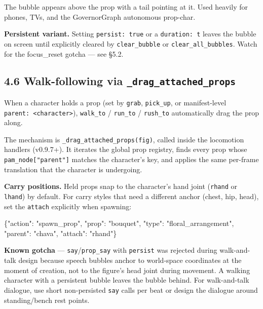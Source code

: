 \documentclass[
  12pt,
  letterpaper,
]{book}
\newenvironment{Shaded}{}{}
\newcommand{\DataTypeTok}[1]{\textcolor[rgb]{0.56,0.13,0.00}{#1}}
\newcommand{\FunctionTok}[1]{\textcolor[rgb]{0.02,0.16,0.49}{#1}}
\newcommand{\StringTok}[1]{\textcolor[rgb]{0.25,0.44,0.63}{#1}}
\begin{document}
The bubble appears above the prop with a tail pointing at it. Used
heavily for phones, TVs, and the GovernorGraph autonomous prop-char.

\textbf{Persistent variant.} Setting \texttt{persist:\ true} or a
\texttt{duration:\ t} leaves the bubble on screen until explicitly
cleared by \texttt{clear\_bubble} or \texttt{clear\_all\_bubbles}. Watch
for the focus\_reset gotcha --- see §5.2.

\subsection{\texorpdfstring{4.6 Walk-following via
\texttt{\_drag\_attached\_props}}{4.6 Walk-following via \_drag\_attached\_props}}\label{walk-following-via-_drag_attached_props}

When a character holds a prop (set by \texttt{grab}, \texttt{pick\_up},
or manifest-level \texttt{parent:\ \textless{}character\textgreater{}}),
\texttt{walk\_to} / \texttt{run\_to} / \texttt{rush\_to} automatically
drag the prop along.

The mechanism is \texttt{\_drag\_attached\_props(fig)}, called inside
the locomotion handlers (v0.9.7+). It iterates the global prop registry,
finds every prop whose \texttt{pam\_node{[}"parent"{]}} matches the
character's key, and applies the same per-frame translation that the
character is undergoing.

\textbf{Carry positions.} Held props snap to the character's hand joint
(\texttt{rhand} or \texttt{lhand}) by default. For carry styles that
need a different anchor (chest, hip, head), set the \texttt{attach}
explicitly when spawning:

\begin{Shaded}
\begin{Highlighting}[]
\FunctionTok{\{}\DataTypeTok{"action"}\FunctionTok{:} \StringTok{"spawn\_prop"}\FunctionTok{,} \DataTypeTok{"prop"}\FunctionTok{:} \StringTok{"bouquet"}\FunctionTok{,}
 \DataTypeTok{"type"}\FunctionTok{:} \StringTok{"floral\_arrangement"}\FunctionTok{,}
 \DataTypeTok{"parent"}\FunctionTok{:} \StringTok{"chava"}\FunctionTok{,} \DataTypeTok{"attach"}\FunctionTok{:} \StringTok{"rhand"}\FunctionTok{\}}
\end{Highlighting}
\end{Shaded}

\textbf{Known gotcha} --- \texttt{say}/\texttt{prop\_say} with
\texttt{persist} was rejected during walk-and-talk design because speech
bubbles anchor to world-space coordinates at the moment of creation, not
to the figure's head joint during movement. A walking character with a
persistent bubble leaves the bubble behind. For walk-and-talk dialogue,
use short non-persisted \texttt{say} calls per beat or design the
dialogue around standing/bench rest points.
\end{document}
